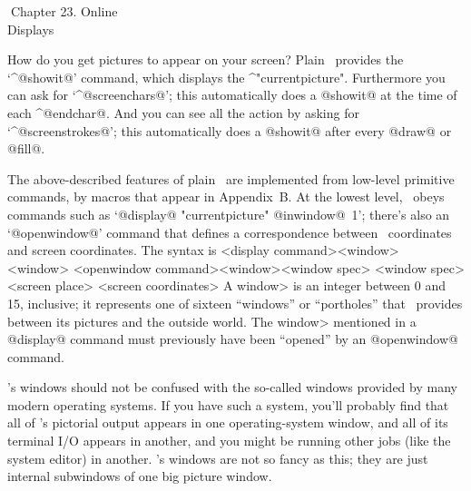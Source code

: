 \eject
\beginchapter Chapter 23. Online\\Displays

How do you get pictures to appear on your screen? Plain \MF\ provides
the `^@showit@' command, which displays the ^"currentpicture".
Furthermore you can ask for `^@screenchars@'; this automatically
does a @showit@ at the time of each ^@endchar@. And you can see all
the action by asking for `^@screenstrokes@'; this automatically
does a @showit@ after every @draw@ or @fill@.

\ddanger The above-described features of plain \MF\ are implemented
from low-level primitive commands, by macros that appear in Appendix~B\null.
At the lowest level, \MF\ obeys commands such as `@display@
"currentpicture" @inwindow@~1'; there's also an `@openwindow@'
command that defines a correspondence between \MF\ coordinates and
screen coordinates. The syntax is
\beginsyntax
<display command><window>
<window>
<openwindow command>\is[openwindow]<window><window spec>
<window spec>
<screen place>
<screen coordinates>
\endsyntax
A \<window> is an integer between 0 and 15, inclusive; it represents
one of sixteen ``windows'' or ``portholes'' that \MF\ provides
between its pictures and the outside world. The \<window> mentioned
in a @display@ command must previously have been ``opened'' by
an @openwindow@ command.

\ddanger \MF's windows should not be confused with the so-called
windows provided by many modern operating systems. If you have
such a system, you'll probably find that all of \MF's pictorial
output appears in one operating-system window, and all of its
terminal I/O appears in another, and you might be running other
jobs (like the system editor) in another. \MF's windows are not so
fancy as this; they are just internal subwindows of one big
picture window.

